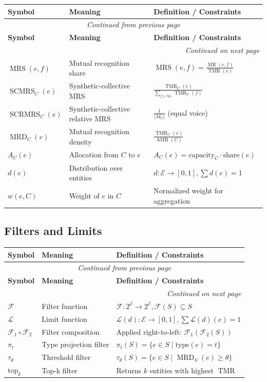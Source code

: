 \documentclass[11pt,a4paper]{article}
\theoremstyle{definition}
\theoremstyle{remark}
\newcommand{\E}{\mathcal{E}}
\newcommand{\F}{\mathcal{F}}
\DeclareMathOperator{\TMR}{TMR}
\DeclareMathOperator{\MR}{MR}
\DeclareMathOperator{\MRS}{MRS}
\DeclareMathOperator{\SCMRS}{SCMRS}
\DeclareMathOperator{\SCRMRS}{SCRMRS}
\DeclareMathOperator{\MRD}{MRD}
\DeclareMathOperator{\AMR}{AMR}
\begin{document}
\begin{longtable}{lll}
\toprule
\textbf{Symbol} & \textbf{Meaning} & \textbf{Definition / Constraints} \\
\midrule
\endfirsthead
\multicolumn{3}{c}{\textit{Continued from previous page}} \\
\toprule
\textbf{Symbol} & \textbf{Meaning} & \textbf{Definition / Constraints} \\
\midrule
\endhead
\midrule
\multicolumn{3}{r}{\textit{Continued on next page}} \\
\endfoot
\bottomrule
\endlastfoot
$\MRS(e,f)$ & Mutual recognition share & $\MRS(e,f) = \frac{\MR(e,f)}{\TMR(e)}$ \\
$\SCMRS_C(e)$ & Synthetic-collective MRS & $\frac{\TMR_C(e)}{\sum_{f \in M_C} \TMR_C(f)}$ \\
$\SCRMRS_C(e)$ & Synthetic-collective relative MRS & $\frac{1}{|M_C|}$ (equal voice) \\
$\MRD_C(e)$ & Mutual recognition density & $\frac{\TMR_C(e)}{\AMR(C)}$ \\
$A_C(e)$ & Allocation from $C$ to $e$ & $A_C(e) = \text{capacity}_C \cdot \text{share}(e)$ \\
$d(e)$ & Distribution over entities & $d: \E \rightarrow [0,1], \sum d(e) = 1$ \\
$w(e,C)$ & Weight of $e$ in $C$ & Normalized weight for aggregation \\
\end{longtable}

\subsection{Filters and Limits}

\begin{longtable}{lll}
\toprule
\textbf{Symbol} & \textbf{Meaning} & \textbf{Definition / Constraints} \\
\midrule
\endfirsthead
\multicolumn{3}{c}{\textit{Continued from previous page}} \\
\toprule
\textbf{Symbol} & \textbf{Meaning} & \textbf{Definition / Constraints} \\
\midrule
\endhead
\midrule
\multicolumn{3}{r}{\textit{Continued on next page}} \\
\endfoot
\bottomrule
\endlastfoot
$\F$ & Filter function & $\F: 2^{\E} \rightarrow 2^{\E}, \F(S) \subseteq S$ \\
$\mathcal{L}$ & Limit function & $\mathcal{L}(d): \E \rightarrow [0,1], \sum \mathcal{L}(d)(e) = 1$ \\
$\F_1 \circ \F_2$ & Filter composition & Applied right-to-left: $\F_1(\F_2(S))$ \\
$\pi_t$ & Type projection filter & $\pi_t(S) = \{e \in S \mid \text{type}(e) = t\}$ \\
$\tau_\theta$ & Threshold filter & $\tau_\theta(S) = \{e \in S \mid \MRD_S(e) \ge \theta\}$ \\
$\text{top}_k$ & Top-k filter & Returns $k$ entities with highest $\TMR$ \\
\end{longtable}
\end{document}
